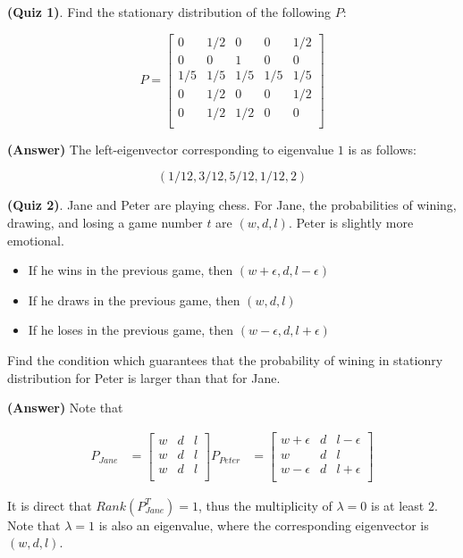 \documentclass[12pt]{article}
\theoremstyle{nonumberbreak}
\begin{document}
\textbf{(Quiz 1)}. Find the stationary distribution of the following $P$:

$$
P = \begin{bmatrix}
0 & 1/2 & 0 & 0 & 1/2 \\
0 & 0 & 1 & 0 & 0 \\
1/5 & 1/5 & 1/5 & 1/5 & 1/5 \\
0 & 1/2 & 0 & 0 & 1/2 \\
0 & 1/2 & 1/2 & 0 & 0 \\
\end{bmatrix}
$$

\textbf{(Answer)} The left-eigenvector corresponding to eigenvalue $1$ is as follows:

$$
(1/12, 3/12, 5/12, 1/12, 2)
$$



\textbf{(Quiz 2)}. Jane and Peter are playing chess. For Jane, the probabilities of wining, drawing, and losing a game number $t$ are $(w,d,l)$. Peter is slightly more emotional.

\begin{itemize}
	\item If he wins in the previous game, then $(w+\epsilon, d, l-\epsilon)$
	\item If he draws in the previous game, then $(w, d, l)$
	\item If he loses in the previous game, then $(w-\epsilon, d, l+\epsilon)$
\end{itemize}

Find the condition which guarantees that the probability of wining in stationry distribution for Peter is larger than that for Jane.


\textbf{(Answer)} Note that 

$$
\begin{aligned}
P_{Jane} &= \begin{bmatrix}
w & d & l \\
w & d & l \\
w & d & l \\
\end{bmatrix}
P_{Peter} &= \begin{bmatrix}
w + \epsilon& d & l-\epsilon \\
w & d & l \\
w - \epsilon & d & l+\epsilon \\
\end{bmatrix}
\end{aligned}
$$

It is direct that $Rank(P_{Jane}^T) = 1$, thus the multiplicity of $\lambda = 0$ is at least $2$. Note that $\lambda =1$ is also an eigenvalue, where the corresponding eigenvector is $(w,d,l)$. 
\end{document}
